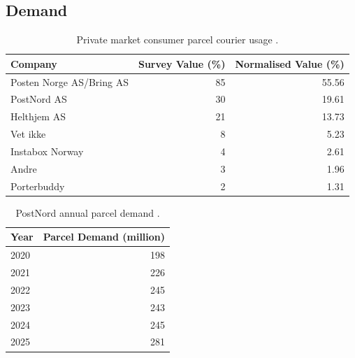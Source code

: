 \documentclass[12pt]{article}
\begin{document}
\subsection{Demand}
\label{subsec:appendix-demand}

\begin{table}[htbp]
  \centering
  \caption{Private market consumer parcel courier usage \parencite{nkom_post_2025}.}
  \label{anx:private_parcel_usage}

  \begin{tabular}{l r r}
    \toprule
    \textbf{Company}         & \textbf{Survey Value (\%)} & \textbf{Normalised Value (\%)} \\
    \midrule
    Posten Norge AS/Bring AS & 85                         & 55.56                          \\
    PostNord AS              & 30                         & 19.61                          \\
    Helthjem AS              & 21                         & 13.73                          \\
    Vet ikke                 & 8                          & 5.23                           \\
    Instabox Norway          & 4                          & 2.61                           \\
    Andre                    & 3                          & 1.96                           \\
    Porterbuddy              & 2                          & 1.31                           \\

    \bottomrule
  \end{tabular}
\end{table}

\begin{table}[htbp]
  \centering
  \caption{PostNord annual parcel demand \parencite{pn_a_2020,pn_a_2021,pn_a_2022,pn_a_2023,pn_a_2024,pn_a_2025}.}
  \label{anx:yearly_pn_demand}

  \begin{tabular}{l r}
    \toprule
    \textbf{Year} & \textbf{Parcel Demand (million)} \\
    \midrule
    2020          & 198                              \\
    2021          & 226                              \\
    2022          & 245                              \\
    2023          & 243                              \\
    2024          & 245                              \\
    2025          & 281                              \\
    \bottomrule
  \end{tabular}
\end{table}
\end{document}
